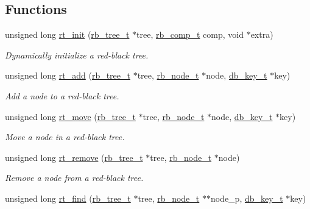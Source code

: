 \subsection*{Functions}
\begin{CompactItemize}
\item 
unsigned long \hyperlink{group__dbprim__rbtree_ga5}{rt\_\-init} (\hyperlink{struct__rb__tree__s}{rb\_\-tree\_\-t} $\ast$tree, \hyperlink{group__dbprim__rbtree_ga3}{rb\_\-comp\_\-t} comp, void $\ast$extra)
\begin{CompactList}\small\item\em Dynamically initialize a red-black tree. \item\end{CompactList}\item 
unsigned long \hyperlink{group__dbprim__rbtree_ga6}{rt\_\-add} (\hyperlink{struct__rb__tree__s}{rb\_\-tree\_\-t} $\ast$tree, \hyperlink{struct__rb__node__s}{rb\_\-node\_\-t} $\ast$node, \hyperlink{struct__db__key__s}{db\_\-key\_\-t} $\ast$key)
\begin{CompactList}\small\item\em Add a node to a red-black tree. \item\end{CompactList}\item 
unsigned long \hyperlink{group__dbprim__rbtree_ga7}{rt\_\-move} (\hyperlink{struct__rb__tree__s}{rb\_\-tree\_\-t} $\ast$tree, \hyperlink{struct__rb__node__s}{rb\_\-node\_\-t} $\ast$node, \hyperlink{struct__db__key__s}{db\_\-key\_\-t} $\ast$key)
\begin{CompactList}\small\item\em Move a node in a red-black tree. \item\end{CompactList}\item 
unsigned long \hyperlink{group__dbprim__rbtree_ga8}{rt\_\-remove} (\hyperlink{struct__rb__tree__s}{rb\_\-tree\_\-t} $\ast$tree, \hyperlink{struct__rb__node__s}{rb\_\-node\_\-t} $\ast$node)
\begin{CompactList}\small\item\em Remove a node from a red-black tree. \item\end{CompactList}\item 
unsigned long \hyperlink{group__dbprim__rbtree_ga9}{rt\_\-find} (\hyperlink{struct__rb__tree__s}{rb\_\-tree\_\-t} $\ast$tree, \hyperlink{struct__rb__node__s}{rb\_\-node\_\-t} $\ast$$\ast$node\_\-p, \hyperlink{struct__db__key__s}{db\_\-key\_\-t} $\ast$key)
$$
\end{CompactItemize}
